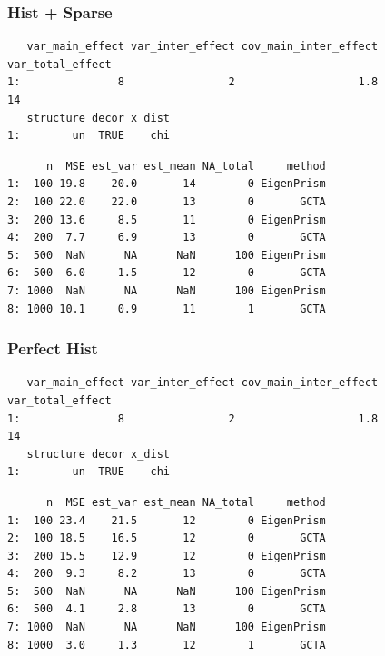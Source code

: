 \documentclass[]{article}
\begin{document}
\subsubsection{Hist + Sparse}\label{hist-sparse-2}

\begin{verbatim}
   var_main_effect var_inter_effect cov_main_inter_effect var_total_effect
1:               8                2                   1.8               14
   structure decor x_dist
1:        un  TRUE    chi
\end{verbatim}

\begin{verbatim}
      n  MSE est_var est_mean NA_total     method
1:  100 19.8    20.0       14        0 EigenPrism
2:  100 22.0    22.0       13        0       GCTA
3:  200 13.6     8.5       11        0 EigenPrism
4:  200  7.7     6.9       13        0       GCTA
5:  500  NaN      NA      NaN      100 EigenPrism
6:  500  6.0     1.5       12        0       GCTA
7: 1000  NaN      NA      NaN      100 EigenPrism
8: 1000 10.1     0.9       11        1       GCTA
\end{verbatim}

\subsubsection{Perfect Hist}\label{perfect-hist}

\begin{verbatim}
   var_main_effect var_inter_effect cov_main_inter_effect var_total_effect
1:               8                2                   1.8               14
   structure decor x_dist
1:        un  TRUE    chi
\end{verbatim}

\begin{verbatim}
      n  MSE est_var est_mean NA_total     method
1:  100 23.4    21.5       12        0 EigenPrism
2:  100 18.5    16.5       12        0       GCTA
3:  200 15.5    12.9       12        0 EigenPrism
4:  200  9.3     8.2       13        0       GCTA
5:  500  NaN      NA      NaN      100 EigenPrism
6:  500  4.1     2.8       13        0       GCTA
7: 1000  NaN      NA      NaN      100 EigenPrism
8: 1000  3.0     1.3       12        1       GCTA
\end{verbatim}
\end{document}
